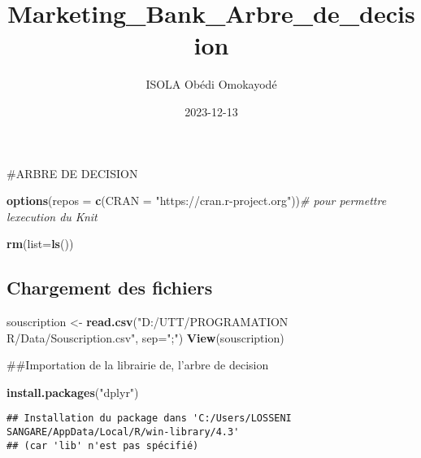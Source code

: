 \documentclass[
]{article}
\title{Marketing\_Bank\_Arbre\_de\_decision}
\author{ISOLA Obédi Omokayodé}
\date{2023-12-13}
\newenvironment{Shaded}{\begin{snugshade}}{\end{snugshade}}
\newcommand{\AttributeTok}[1]{\textcolor[rgb]{0.13,0.29,0.53}{#1}}
\newcommand{\CommentTok}[1]{\textcolor[rgb]{0.56,0.35,0.01}{\textit{#1}}}
\newcommand{\FunctionTok}[1]{\textcolor[rgb]{0.13,0.29,0.53}{\textbf{#1}}}
\newcommand{\NormalTok}[1]{#1}
\newcommand{\OtherTok}[1]{\textcolor[rgb]{0.56,0.35,0.01}{#1}}
\newcommand{\StringTok}[1]{\textcolor[rgb]{0.31,0.60,0.02}{#1}}
\begin{document}
\maketitle

\#ARBRE DE DECISION

\begin{Shaded}
\begin{Highlighting}[]
\FunctionTok{options}\NormalTok{(}\AttributeTok{repos =} \FunctionTok{c}\NormalTok{(}\AttributeTok{CRAN =} \StringTok{"https://cran.r{-}project.org"}\NormalTok{))}\CommentTok{\# pour permettre l\textquotesingle{}execution du Knit}
\end{Highlighting}
\end{Shaded}

\begin{Shaded}
\begin{Highlighting}[]
\FunctionTok{rm}\NormalTok{(}\AttributeTok{list=}\FunctionTok{ls}\NormalTok{())}
\end{Highlighting}
\end{Shaded}

\hypertarget{chargement-des-fichiers}{%
\subsection{Chargement des fichiers}\label{chargement-des-fichiers}}

\begin{Shaded}
\begin{Highlighting}[]
\NormalTok{souscription }\OtherTok{\textless{}{-}} \FunctionTok{read.csv}\NormalTok{(}\StringTok{"D:/UTT/PROGRAMATION R/Data/Souscription.csv"}\NormalTok{, }\AttributeTok{sep=}\StringTok{";"}\NormalTok{)}
\FunctionTok{View}\NormalTok{(souscription)}
\end{Highlighting}
\end{Shaded}

\#\#Importation de la librairie de, l'arbre de decision

\begin{Shaded}
\begin{Highlighting}[]
\FunctionTok{install.packages}\NormalTok{(}\StringTok{"dplyr"}\NormalTok{)}
\end{Highlighting}
\end{Shaded}

\begin{verbatim}
## Installation du package dans 'C:/Users/LOSSENI SANGARE/AppData/Local/R/win-library/4.3'
## (car 'lib' n'est pas spécifié)
\end{verbatim}
\end{document}

